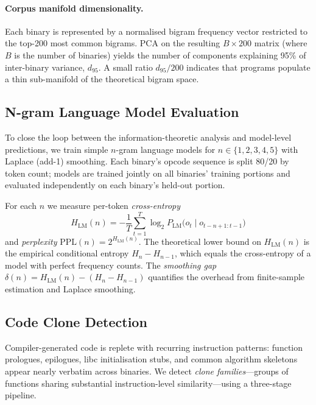 \documentclass[10pt,twocolumn]{article}
\begin{document}
\paragraph{Corpus manifold dimensionality.}
Each binary is represented by a normalised bigram frequency vector restricted
to the top-200 most common bigrams.  PCA on the resulting $B \times 200$ matrix
(where $B$ is the number of binaries) yields the number of components
explaining 95\% of inter-binary variance, $d_{95}$.  A small ratio
$d_{95}/200$ indicates that programs populate a thin sub-manifold of the
theoretical bigram space.

\subsection{N-gram Language Model Evaluation}
\label{sec:lm_method}

To close the loop between the information-theoretic analysis and model-level
predictions, we train simple $n$-gram language models for $n \in \{1,2,3,4,5\}$
with Laplace (add-1) smoothing.  Each binary's opcode sequence is split 80/20
by token count; models are trained jointly on all binaries' training portions
and evaluated independently on each binary's held-out portion.

For each $n$ we measure per-token \emph{cross-entropy}
\begin{equation}
  H_{\mathrm{LM}}(n) = -\frac{1}{T}\sum_{t=1}^{T}
        \log_2 P_{\mathrm{LM}}\!\bigl(o_t \mid o_{t-n+1:t-1}\bigr)
  \label{eq:lmce}
\end{equation}
and \emph{perplexity} $\mathrm{PPL}(n) = 2^{H_{\mathrm{LM}}(n)}$.  The
theoretical lower bound on $H_{\mathrm{LM}}(n)$ is the empirical conditional
entropy $H_n - H_{n-1}$, which equals the cross-entropy of a model with
perfect frequency counts.  The \emph{smoothing gap}
$\delta(n) = H_{\mathrm{LM}}(n) - (H_n - H_{n-1})$ quantifies the overhead
from finite-sample estimation and Laplace smoothing.

\subsection{Code Clone Detection}
\label{sec:clone_method}

Compiler-generated code is replete with recurring instruction patterns:
function prologues, epilogues, libc initialisation stubs, and common algorithm
skeletons appear nearly verbatim across binaries.  We detect \emph{clone
families}---groups of functions sharing substantial instruction-level
similarity---using a three-stage pipeline.
\end{document}
